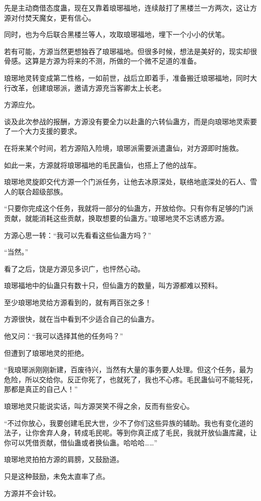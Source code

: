 \begin{this_body}
先是主动商借态度蛊，现在又靠着琅琊福地，连续敲打了黑楼兰一方两次，这让方源对付焚天魔女，更有信心。

同时，也为今后联合黑楼兰等人，攻取琅琊福地，埋下一个小小的伏笔。

若有可能，方源当然更想独吞了琅琊福地。但很多时候，想法是美好的，现实却很骨感。这算是方源为将来的不测，所做的一个微不足道的准备。

琅琊地灵转变成第二性格，一如前世，战后立即着手，准备搬迁琅琊福地，同时大行改革，创建琅琊派，邀请方源充当客卿太上长老。

方源应允。

谈及此次参战的报酬，方源没有要全力以赴蛊的六转仙蛊方，而是向琅琊地灵索要了一个大力支援的要求。

在将来某个时间，若方源陷入险境，琅琊派需要派遣蛊仙，对方源即时施救。

如此一来，方源就将琅琊福地的毛民蛊仙，也搭上了他的战车。

琅琊地灵旋即交代方源一个门派任务，让他去冰原深处，联络地底深处的石人、雪人的联合超级部族。

“只要你完成这个任务，我就将一部分的仙蛊方，开放给你。只有你有足够的门派贡献，就能消耗这些贡献，换取想要的仙蛊方。”琅琊地灵不忘诱惑方源。

方源心思一转：“我可以先看看这些仙蛊方吗？”

“当然。”

看了之后，饶是方源见多识广，也怦然心动。

琅琊福地中的仙蛊只有数十只，但仙蛊方的数量，叫方源都难以预料。

至少琅琊地灵给方源看到的，就有两百张之多！

方源很快，就在当中看到不少适合自己的仙蛊方。

他又问：“我可以选择其他的任务吗？”

但遭到了琅琊地灵的拒绝。

“我琅琊派刚刚新建，百废待兴，当然有大量的事务要人处理。但这个任务，最为危险，所以交给你。反正你死了，也就死了，我也不心疼。毛民蛊仙可不能轻死，那都是真正的自己人！”

琅琊地灵只能说实话，叫方源哭笑不得之余，反而有些安心。

“不过你放心，我要创建毛民大世，少不了你们这些异族的辅助。我也有变化道的法子，让你舍弃人身，转成毛民呢。等到你真正成了毛民，我就开放仙蛊库藏，让你可以凭借贡献，借仙蛊或者换仙蛊。哈哈哈……”

琅琊地灵拍拍方源的肩膀，又鼓励道。

只是这种鼓励，未免太直率了点。

方源并不会计较。


\end{this_body}
